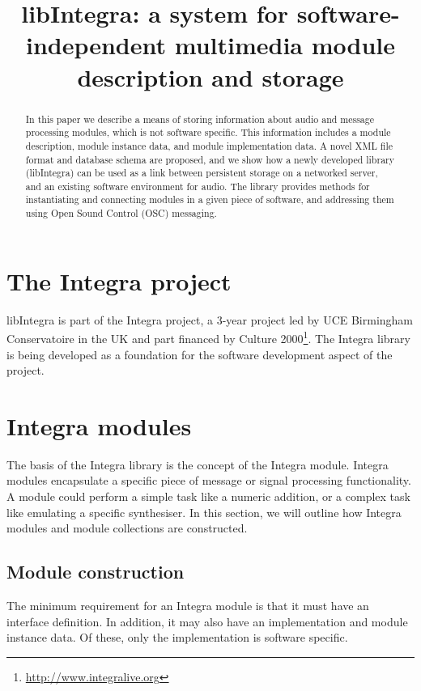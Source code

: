 \documentclass{article}
\title{libIntegra: a system for software-independent multimedia module description and storage}
\begin{document}
%
\maketitle
%
\begin{abstract}
In this paper we describe a means of storing information about audio and message processing modules, which is not software specific. This information includes a module description, module instance data, and module implementation data. A novel XML file format and database schema are proposed, and we show how a newly developed library (libIntegra) can be used as a link between persistent storage on a networked server, and an existing software environment for audio. The library provides methods for instantiating and connecting modules in a given piece of software, and addressing them using Open Sound Control (OSC) messaging. 
\end{abstract}

\section{The Integra project}\label{sec:introduction}

libIntegra is part of the Integra project, a 3-year project led by UCE Birmingham Conservatoire in the UK and part financed by Culture 2000\footnote{\url{http://www.integralive.org}}. The Integra library is being developed as a foundation for the software development aspect of the project. 

\section{Integra modules}\label{sec:modules}

The basis of the Integra library is the concept of the Integra module. Integra modules encapsulate a specific piece of message or signal processing functionality. A module could perform a simple task like a numeric addition, or a complex task like emulating a specific synthesiser. In this section, we will outline how Integra modules and module collections are constructed.

\subsection{Module construction}\label{subsec:module_construction}

The minimum requirement for an Integra module is that it must have an interface definition. In addition, it may also have an implementation and module instance data. Of these, only the implementation is software specific.
\end{document}
